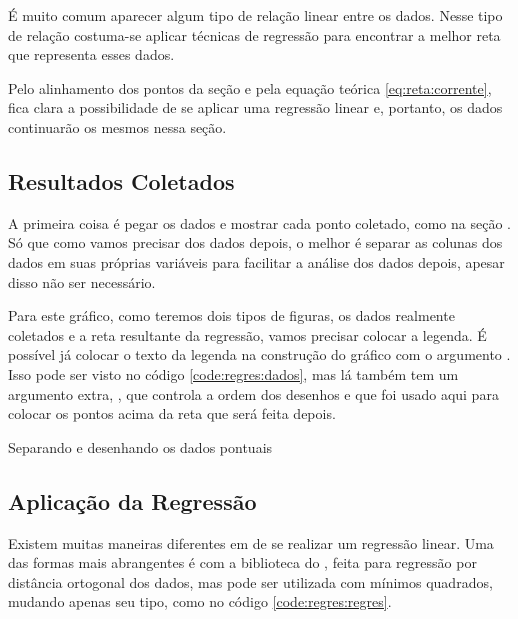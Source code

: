 É muito comum aparecer algum tipo de relação linear entre os dados. Nesse tipo de relação costuma-se aplicar técnicas de regressão para encontrar a melhor reta que representa esses dados.

Pelo alinhamento dos pontos da seção  e pela equação teórica \ref{eq:reta:corrente}, fica clara a possibilidade de se aplicar uma regressão linear e, portanto, os dados continuarão os mesmos nessa seção.


\subsection{Resultados Coletados}

    A primeira coisa é pegar os dados e mostrar cada ponto coletado, como na seção . Só que como vamos precisar dos dados depois, o melhor é separar as colunas dos dados em suas próprias variáveis para facilitar a análise dos dados depois, apesar disso não ser necessário.

    Para este gráfico, como teremos dois tipos de figuras, os dados realmente coletados e a reta resultante da regressão, vamos precisar colocar a legenda. É possível já colocar o texto da legenda na construção do gráfico com o argumento . Isso pode ser visto no código \ref{code:regres:dados}, mas lá também tem um argumento extra, , que controla a ordem dos desenhos e que foi usado aqui para colocar os pontos acima da reta que será feita depois.

    \begin{listing}[H]
        \caption{Separando e desenhando os dados pontuais}
        \label{code:regres:dados}

    \end{listing}


\subsection{Aplicação da Regressão}

    Existem muitas maneiras diferentes em \software de se realizar um regressão linear. Uma das formas mais abrangentes é com a biblioteca  do \scipy, feita para regressão por distância ortogonal dos dados, mas pode ser utilizada com mínimos quadrados, mudando apenas seu tipo, como no código \ref{code:regres:regres}.

